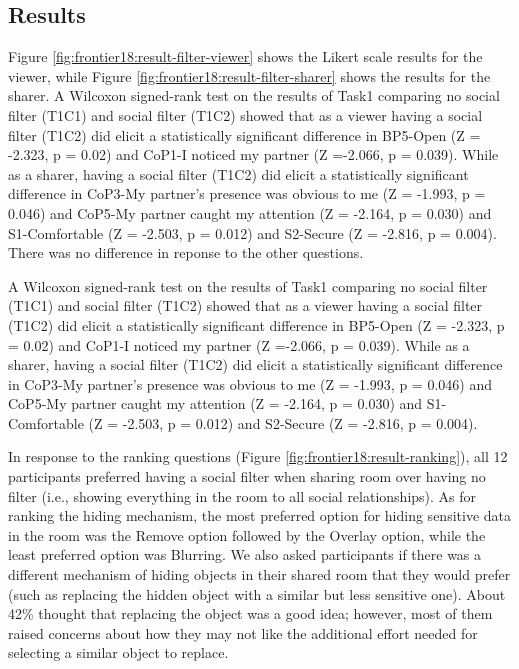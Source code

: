 \subsection{Results}

Figure \ref{fig:frontier18:result-filter-viewer} shows the Likert scale results for the viewer, while Figure \ref{fig:frontier18:result-filter-sharer} shows the results for the sharer. A Wilcoxon signed-rank test on the results of Task1 comparing no social filter (T1C1) and social filter (T1C2) showed that as a viewer having a social filter (T1C2) did elicit a statistically significant difference in BP5-Open (Z = -2.323, p = 0.02) and CoP1-I noticed my partner (Z =-2.066, p = 0.039). While as a sharer, having a social filter (T1C2) did elicit a statistically significant difference in CoP3-My partner's presence was obvious to me (Z = -1.993, p = 0.046) and CoP5-My partner caught my attention (Z = -2.164, p = 0.030) and S1-Comfortable (Z = -2.503, p = 0.012) and S2-Secure (Z = -2.816, p = 0.004). There was no difference in reponse to the other questions.

A Wilcoxon signed-rank test on the results of Task1 comparing no social filter (T1C1) and social filter (T1C2) showed that as a viewer having a social filter (T1C2) did elicit a statistically significant difference in BP5-Open (Z = -2.323, p = 0.02) and CoP1-I noticed my partner (Z =-2.066, p = 0.039). While as a sharer, having a social filter (T1C2) did elicit a statistically significant difference in CoP3-My partner's presence was obvious to me (Z = -1.993, p = 0.046) and CoP5-My partner caught my attention (Z = -2.164, p = 0.030) and S1-Comfortable (Z = -2.503, p = 0.012) and S2-Secure (Z = -2.816, p = 0.004).

In response to the ranking questions (Figure \ref{fig:frontier18:result-ranking}), all 12 participants preferred having a social filter when sharing room over having no filter (i.e., showing everything in the room to all social relationships). As for ranking the hiding mechanism, the most preferred option for hiding sensitive data in the room was the Remove option followed by the Overlay option, while the least preferred option was Blurring. 
We also asked participants if there was a different mechanism of hiding objects in their shared room that they would prefer (such as replacing the hidden object with a similar but less sensitive one). About 42\% thought that replacing the object was a good idea; however, most of them raised concerns about how they may not like the additional effort needed for selecting a similar object to replace.

